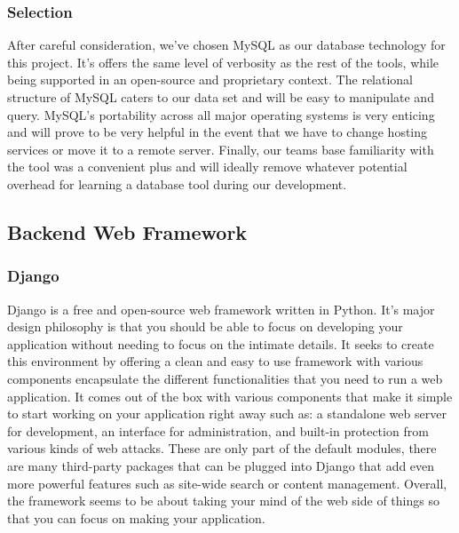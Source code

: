 \subsubsection{Selection}
After careful consideration, we’ve chosen MySQL as our database technology for this project. 
It’s offers the same level of verbosity as the rest of the tools, while being supported in an open-source and proprietary context. 
The relational structure of MySQL caters to our data set and will be easy to manipulate and query. 
MySQL’s portability across all major operating systems is very enticing and will prove to be very helpful in the event that we have to change hosting services or move it to a remote server. 
Finally, our teams base familiarity with the tool was a convenient plus and will ideally remove whatever potential overhead for learning a database tool during our development. 


\subsection{Backend Web Framework}

\subsubsection{Django}
Django is a free and open-source web framework written in Python. 
It’s major design philosophy is that you should be able to focus on developing your application without needing to focus on the intimate details. 
It seeks to create this environment by offering a clean and easy to use framework with various components encapsulate the different functionalities that you need to run a web application. 
It comes out of the box with various components that make it simple to start working on your application right away such as: a standalone web server for development, an interface for administration, and built-in protection from various kinds of web attacks. 
These are only part of the default modules, there are many third-party packages that can be plugged into Django that add even more powerful features such as site-wide search or content management. 
Overall, the framework seems to be about taking your mind of the web side of things so that you can focus on making your application.

